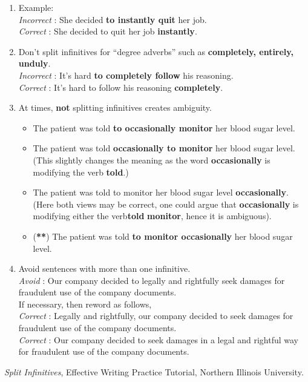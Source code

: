 \documentclass[12pt]{article} %
\begin{document}
\begin{enumerate}
  \item Example:\\
  \textit{Incorrect} : She decided \textbf{to instantly quit} her job.\\
  \textit{Correct} : She decided to quit her job \textbf{instantly}.

 \item Don't split infinitives for ``degree adverbs'' such as \textbf{completely, entirely, unduly}.\\
 \textit{Incorrect} : It's hard \textbf{to completely follow} his reasoning.\\
 \textit{Correct} : It's hard to follow his reasoning \textbf{completely}.

  
  \item At times, \textbf{not} splitting infinitives creates ambiguity.
  \begin{itemize}
    \item The patient was told \textbf{to occasionally monitor} her blood sugar level.
    \item The patient was told \textbf{occasionally to monitor} her blood sugar level.\\
      (This slightly changes the meaning as the word \textbf{occasionally} is modifying the verb \textbf{told}.)
    \item The patient was told to monitor her blood sugar level \textbf{occasionally}.\\
     (Here both views may be correct, one could argue that \textbf{occasionally} is modifying either the verb\textbf{told}
     \textbf{monitor}, hence it is ambiguous).
    \item (\textbf{**}) The patient was told \textbf{to monitor occasionally} her blood sugar level.
  \end{itemize}
  
  \item Avoid sentences with more than one infinitive.\\
  \textit{Avoid} : Our company decided to legally and rightfully seek damages for fraudulent use of the company documents.\\
  If necessary, then reword as follows,\\
  \textit{Correct} : Legally and rightfully, our company decided to seek damages for fraudulent use of the company documents.\\
  \textit{Correct} : Our company decided to seek damages in a legal and rightful way for fraudulent use of the company documents.

  

  
\end{enumerate}


\vspace*{2cm}




\textit{Split Infinitives}, Effective Writing Practice Tutorial, Northern Illinois University.\\
\end{document}
